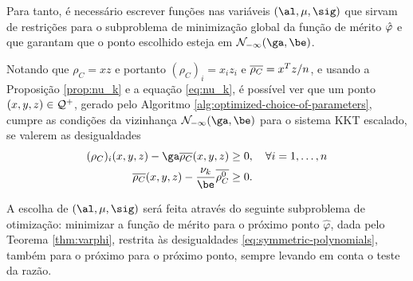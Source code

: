 Para tanto, é necessário  escrever funções nas variáveis
$(\al,\mu,\sig)$ que sirvam de restrições para o subproblema de minimização global da
função de mérito $\hat{\varphi}$ e que garantam que o ponto escolhido esteja em 
$\Nset_{-\infty}(\ga,\be)$. 


Notando  que $\rho_C = xz$ e portanto $(\rho_C)_i = x_iz_i$ e
$\overline{\rho_C} = x^Tz/n$, e usando a Proposição \ref{prop:nu_k} e a equação \eqref{eq:nu_k}, é possível ver que um ponto $(x,y,z)\in\mathcal{Q}^+$, gerado pelo Algoritmo 
\ref{alg:optimized-choice-of-parameters}, cumpre as condições da vizinhança
$\Nset_{-\infty}(\ga,\be)$ para o sistema \ac{KKT} escalado, se valerem as  desigualdades 
\begin{subequations}
\label{eq:symmetric-polynomials}
\begin{align} 
  (\rho_C)_i(x,y,z) -  \ga\dbvec{\rho_C}(x,y,z)  & \geq 0, \quad \forall i=1,\ldots,n %
 \label{eq:symmetric-polynomials-b} \\ 
   \dbvec{\rho_C}(x,y,z) - \frac{\nuk}{\be} \dbvec{\rho_C^0}  &\geq 0 .
 \label{eq:symmetric-polynomials-a}
\end{align} 
\end{subequations}


A escolha de  $(\al,\mu,\sig)$ será feita através do seguinte subproblema de
otimização: minimizar a função de mérito para o próximo ponto $\hat\varphi$,
dada pelo Teorema \ref{thm:varphi}, restrita às desigualdades \eqref{eq:symmetric-polynomials}, também para o próximo
para o próximo ponto,  sempre  levando em conta o
teste da razão.












